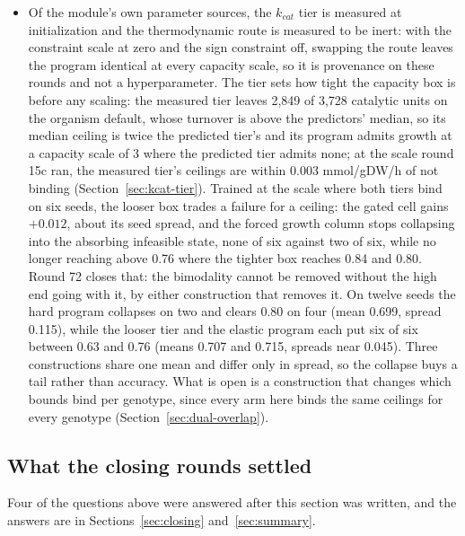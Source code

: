 \begin{itemize}
    and whether a store solved so that no column reaches the clamp beats one cut after
    the fact.
  \item Of the module's own parameter sources, the $k_{cat}$ tier is measured at
    initialization and the thermodynamic route is measured to be inert: with the
    constraint scale at zero and the sign constraint off, swapping the route leaves the
    program identical at every capacity scale, so it is provenance on these rounds and
    not a hyperparameter. The tier sets how
    tight the capacity box is before any scaling: the measured tier leaves 2,849 of
    3,728 catalytic units on the organism default, whose turnover is above the
    predictors' median, so its median ceiling is twice the predicted tier's and its
    program admits growth at a capacity scale of 3 where the predicted tier admits
    none; at the scale round 15c ran, the measured tier's ceilings are within 0.003
    mmol/gDW/h of not binding (Section~\ref{sec:kcat-tier}). Trained at the scale where
    both tiers bind on six seeds, the looser box trades a failure for a ceiling: the
    gated cell gains $+0.012$, about its seed spread, and the forced growth column
    stops collapsing into the absorbing infeasible state, none of six against two of
    six, while no longer reaching above 0.76 where the tighter box reaches 0.84 and
    0.80. Round 72 closes that: the bimodality cannot be removed without the high end going
    with it, by either construction that removes it. On twelve seeds the hard program
    collapses on two and clears 0.80 on four (mean 0.699, spread 0.115), while the
    looser tier and the elastic program each put six of six between 0.63 and 0.76
    (means 0.707 and 0.715, spreads near 0.045). Three constructions share one mean and
    differ only in spread, so the collapse buys a tail rather than accuracy. What is
    open is a construction that changes which bounds bind per genotype, since every
    arm here binds the same ceilings for every genotype
    (Section~\ref{sec:dual-overlap}).
\end{itemize}

\subsection{What the closing rounds settled}
\label{sec:open-closed}

Four of the questions above were answered after this section was written, and the answers
are in Sections~\ref{sec:closing} and~\ref{sec:summary}.


